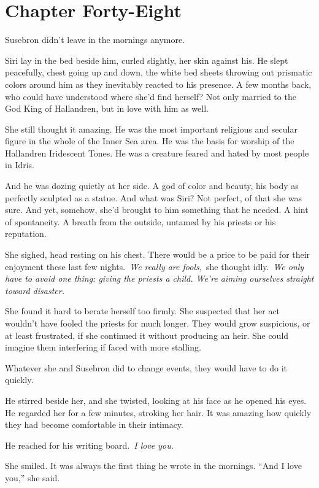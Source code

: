 \section{Chapter Forty-Eight}

Susebron didn’t leave in the mornings anymore.

Siri lay in the bed beside him, curled slightly, her skin against his. He slept peacefully, chest going up and down, the white bed sheets throwing out prismatic colors around him as they inevitably reacted to his presence. A few months back, who could have understood where she’d find herself? Not only married to the God King of Hallandren, but in love with him as well.

She still thought it amazing. He was the most important religious and secular figure in the whole of the Inner Sea area. He was the basis for worship of the Hallandren Iridescent Tones. He was a creature feared and hated by most people in Idris.

And he was dozing quietly at her side. A god of color and beauty, his body as perfectly sculpted as a statue. And what was Siri? Not perfect, of that she was sure. And yet, somehow, she’d brought to him something that he needed. A hint of spontaneity. A breath from the outside, untamed by his priests or his reputation.

She sighed, head resting on his chest. There would be a price to be paid for their enjoyment these last few nights.~\textit{We really are fools,}~she thought idly.~\textit{We only have to avoid one thing: giving the priests a child. We’re aiming ourselves straight toward disaster.}

She found it hard to berate herself too firmly. She suspected that her act wouldn’t have fooled the priests for much longer. They would grow suspicious, or at least frustrated, if she continued it without producing an heir. She could imagine them interfering if faced with more stalling.

Whatever she and Susebron did to change events, they would have to do it quickly.

He stirred beside her, and she twisted, looking at his face as he opened his eyes. He regarded her for a few minutes, stroking her hair. It was amazing how quickly they had become comfortable in their intimacy.

He reached for his writing board.~\textit{I love you.}

She smiled. It was always the first thing he wrote in the mornings. “And I love you,” she said.

